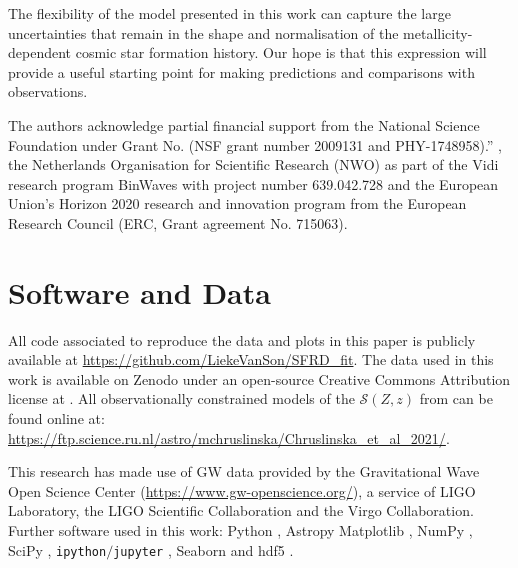 \documentclass[twocolumn]{aastex631}
\newcommand{\SFRDzZ}{\ensuremath{\mathcal{S}(Z,z)}\xspace}
\begin{document}
The flexibility of the model presented in this work can capture the large uncertainties that remain in the shape and normalisation of the metallicity-dependent cosmic star formation history. 
Our hope is that this expression will provide a useful starting point for making predictions and comparisons with observations.


\begin{acknowledgments}
The authors acknowledge partial financial support from the  National Science Foundation under Grant No. (NSF grant number 2009131  and PHY-1748958).”
, the Netherlands Organisation for Scientific Research (NWO) as part of the Vidi research program BinWaves with project number 639.042.728 and the European Union’s Horizon 2020 research and innovation program from the European Research Council (ERC, Grant agreement No. 715063). 
\end{acknowledgments}


\section*{Software and Data}
All code associated to reproduce the data and plots in this paper is publicly available at \url{https://github.com/LiekeVanSon/SFRD_fit}.
The data used in this work is available on Zenodo under an open-source Creative Commons Attribution license at .
All observationally constrained models of the \SFRDzZ from \cite{Chruslinska+2021} can be found online at: \url{https://ftp.science.ru.nl/astro/mchruslinska/Chruslinska_et_al_2021/}.


This research has made use of GW data provided by the Gravitational Wave Open Science Center (\url{https://www.gw-openscience.org/}), a service of LIGO Laboratory, the LIGO Scientific Collaboration and the Virgo Collaboration. 
Further software used in this work: Python \citep{PythonReferenceManual},  Astropy \citep{astropy:2013,astropy:2018} Matplotlib \citep{2007CSE.....9...90H},  {NumPy} \citep{2020NumPy-Array}, SciPy \citep{2020SciPy-NMeth}, \texttt{ipython$/$jupyter} \citep{2007CSE.....9c..21P, Kluyver2016jupyter},  Seaborn \citep{waskom2020seaborn}  and  {hdf5}   \citep{collette_python_hdf5_2019}. 
\end{document}
